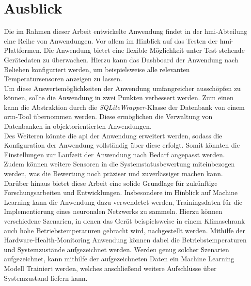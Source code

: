 \chapter{Ausblick}
Die im Rahmen dieser Arbeit entwickelte Anwendung findet in der \ac{hmi}-Abteilung eine Reihe von Anwendungen. Vor allem im Hinblick auf das Testen der \ac{hmi}-Plattformen. Die Anwendung bietet eine flexible Möglichkeit unter Test stehende Gerätedaten zu überwachen. Hierzu kann das Dashboard der Anwendung nach Belieben konfiguriert werden, um beispielsweise alle relevanten Temperatursensoren anzeigen zu lassen.\\
Um diese Auswertemöglichkeiten der Anwendung umfangreicher ausschöpfen zu können, sollte die Anwendung in zwei Punkten verbessert werden. Zum einen kann die Abstraktion durch die \textit{SQLiteWrapper}-Klasse der Datenbank von einem \ac{orm}-Tool übernommen werden. Diese ermöglichen die Verwaltung von Datenbanken in objektorientierten Anwendungen.\cite{ormDB}\\
Des Weiteren könnte die \ac{api} der Anwendung erweitert werden, sodass die Konfiguration der Anwendung vollständig über diese erfolgt. Somit könnten die Einstellungen zur Laufzeit der Anwendung nach Bedarf angepasst werden.\\
Zudem können weitere Sensoren in die Systemstatusbewertung miteinbezogen werden, was die Bewertung noch präziser und zuverlässiger machen kann.\\
Darüber hinaus bietet diese Arbeit eine solide Grundlage für zukünftige Forschungsarbeiten und Entwicklungen. Insbesondere im Hinblick auf Machine Learning kann die Anwendung dazu verwendetet werden, Trainingsdaten für die Implementierung eines neuronalen Netzwerks zu sammeln. Hierzu können verschiedene Szenarien, in denen das Gerät beispielsweise in einem Klimaschrank auch hohe Betriebstemperaturen gebracht wird, nachgestellt werden. Mithilfe der Hardware-Health-Monitoring Anwendung können dabei die Betriebstemperaturen und Systemzustände aufgezeichnet werden. Werden genug solcher Szenarien aufgezeichnet, kann mithilfe der aufgezeichneten Daten ein Machine Learning Modell Trainiert werden, welches anschließend weitere Aufschlüsse über Systemzustand liefern kann.